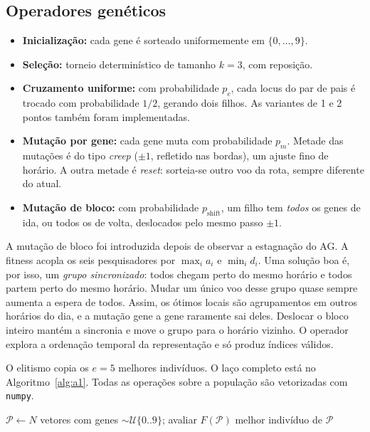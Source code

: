 \documentclass[conference]{IEEEtran}
\newcommand{\code}[1]{\texttt{#1}}
\begin{document}
\subsection{Operadores genéticos}
\begin{itemize}
\item \textbf{Inicialização:} cada gene é sorteado uniformemente em $\{0,\dots,9\}$.
\item \textbf{Seleção:} torneio determinístico de tamanho $k=3$, com reposição.
\item \textbf{Cruzamento uniforme:} com probabilidade $p_c$, cada locus do par de pais é trocado com probabilidade $1/2$, gerando dois filhos. As variantes de 1 e 2 pontos também foram implementadas.
\item \textbf{Mutação por gene:} cada gene muta com probabilidade $p_m$. Metade das mutações é do tipo \emph{creep} ($\pm1$, refletido nas bordas), um ajuste fino de horário. A outra metade é \emph{reset}: sorteia-se outro voo da rota, sempre diferente do atual.
\item \textbf{Mutação de bloco:} com probabilidade $p_{\text{shift}}$, um filho tem \emph{todos} os genes de ida, ou todos os de volta, deslocados pelo mesmo passo $\pm1$.
\end{itemize}

A mutação de bloco foi introduzida depois de observar a estagnação do AG. A fitness acopla os seis pesquisadores por $\max_i a_i$ e $\min_i d_i$. Uma solução boa é, por isso, um \emph{grupo sincronizado}: todos chegam perto do mesmo horário e todos partem perto do mesmo horário. Mudar um único voo desse grupo quase sempre aumenta a espera de todos. Assim, os ótimos locais são agrupamentos em outros horários do dia, e a mutação gene a gene raramente sai deles. Deslocar o bloco inteiro mantém a sincronia e move o grupo para o horário vizinho. O operador explora a ordenação temporal da representação e só produz índices válidos.

O elitismo copia os $e=5$ melhores indivíduos. O laço completo está no Algoritmo~\ref{alg:a1}. Todas as operações sobre a população são vetorizadas com \code{numpy}.

\begin{algorithm}[!t]
\caption{AG da Atividade 1 (implementação própria)}
\label{alg:a1}
\small
{}
$\mathcal{P}\leftarrow N$ vetores com genes $\sim\mathcal{U}\{0..9\}$; avaliar $F(\mathcal{P})$\;
\Return melhor indivíduo de $\mathcal{P}$\;
\end{algorithm}
\end{document}
